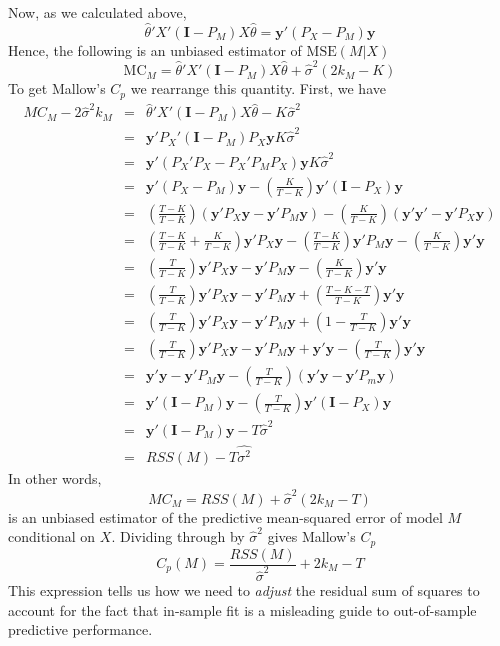 \documentclass[12pt]{article}
\theoremstyle{definition}
\begin{document}
Now, as we calculated above,
	$$\widehat{\theta}'X'(\mathbf{I} - P_M)X\widehat{\theta} = \textbf{y}'(P_X - P_M)\textbf{y}$$
Hence, the following is an unbiased estimator of $\mbox{MSE}(M|X)$
	$$\mbox{MC}_M = \widehat{\theta}'X'(\mathbf{I} - P_M)X\widehat{\theta} +\widehat{\sigma}^2( 2k_M -  K)$$
To get Mallow's $C_p$ we rearrange this quantity. First, we have
\begin{eqnarray*}
	MC_M - 2\widehat{\sigma}^2k_M &=& \widehat{\theta}'X'(\mathbf{I} - P_M)X\widehat{\theta} - K\widehat{\sigma}^2\\
	&=& \mathbf{y}'P_X'(\mathbf{I} - P_M)P_X \mathbf{y}K\widehat{\sigma}^2\\
	&=&\mathbf{y}'(P_X'P_X - P_X'P_MP_X)\mathbf{y}K\widehat{\sigma}^2\\
	 &=& \mathbf{y}'(P_X - P_M)\mathbf{y} - \left(\frac{K}{T-K}\right)\mathbf{y}'\left(\mathbf{I} - P_X\right)\mathbf{y}\\
		&=& \left(\frac{T-K}{T-K}\right)(\mathbf{y}'P_X\mathbf{y} - \mathbf{y}'P_M\mathbf{y}) - \left(\frac{K}{T-K}\right)(\mathbf{y}'\mathbf{y}' - \mathbf{y}'P_X \mathbf{y})\\
			&=&\left(\frac{T-K}{T-K} + \frac{K}{T-K}\right)\mathbf{y}'P_X \mathbf{y}  - \left(\frac{T-K}{T-K}\right)\mathbf{y}'P_M\mathbf{y} - \left(\frac{K}{T-K}\right)\mathbf{y}'\mathbf{y} \\
			&=&\left(\frac{T}{T-K}\right)\mathbf{y}'P_X \mathbf{y} - \mathbf{y}'P_M\mathbf{y} - \left(\frac{K}{T-K} \right)\mathbf{y}'\mathbf{y}  \\
			&=& \left(\frac{T}{T-K}\right)\mathbf{y}'P_X \mathbf{y} - \mathbf{y}'P_M\mathbf{y} + \left(\frac{T - K - T}{T-K} \right)\mathbf{y}'\mathbf{y}  \\
			&=&  \left(\frac{T}{T-K} \right)\mathbf{y}'P_X \mathbf{y} - \mathbf{y}' P_M \mathbf{y} + \left(1 - \frac{T}{T-K}\right)\mathbf{y}'\mathbf{y} \\
			&=&  \left(\frac{T}{T-K} \right)\mathbf{y}'P_X \mathbf{y} - \mathbf{y}' P_M \mathbf{y} + \mathbf{y}'\mathbf{y} - \left(\frac{T}{T-K}\right)\mathbf{y}'\mathbf{y}  \\
			&=& \mathbf{y}'\mathbf{y} - \mathbf{y}'P_M\mathbf{y} - \left(\frac{T}{T-K} \right)(\mathbf{y}'\mathbf{y} - \mathbf{y}'P_m\mathbf{y})\\
			&=& \mathbf{y}'(\mathbf{I} - P_M)\mathbf{y} - \left(\frac{T}{T-K}\right)\mathbf{y}'\left(\mathbf{I} - P_X\right)\mathbf{y}\\
			&=& \mathbf{y}'(\mathbf{I} - P_M)\mathbf{y} - T\widehat{\sigma}^2\\
			&=& RSS(M) - T\widehat{\sigma^2}
\end{eqnarray*}
In other words,
	$$MC_M = RSS(M) + \widehat{\sigma}^2(2 k_M - T)$$
is an unbiased estimator of the predictive mean-squared error of model $M$ conditional on $X$. 
Dividing through by $\widehat{\sigma}^2$ gives Mallow's $C_p$
	$$C_p(M) = \frac{RSS(M)}{\widehat{\sigma}^2} + 2k_M - T$$
This expression tells us how we need to \emph{adjust} the residual sum of squares to account for the fact that in-sample fit is a misleading guide to out-of-sample predictive performance.
\end{document}
